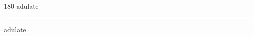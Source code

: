 
\begin{frame}
\begin{center}
\begin{turn}{180}
{\fontsize{2.5cm}{1em}\selectfont adulate}
\end{turn}
\vspace{1em}\par  
\hrule
\vspace{1em}\par  
{\fontsize{2.5cm}{1em}\selectfont adulate}
\end{center}
\end{frame}
